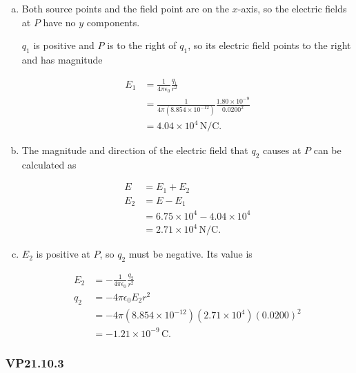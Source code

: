 \documentclass{article}
\begin{document}
\begin{enumerate}[a)]
  \item Both source points and the field point are on the $x$-axis, so the electric fields at $P$ have no $y$ components.

        $q_1$ is positive and $P$ is to the right of $q_1$, so its electric field points to the right and has magnitude

        \begin{align*}
          E_1 & = \frac{1}{4 \pi \epsilon_0} \frac{q_1}{r^2}                                   \\
              & = \frac{1}{4 \pi (8.854 \times 10^{-12})} \frac{1.80 \times 10^{-9}}{0.0200^2} \\
              & = 4.04 \times 10^4 \,\textrm{N}/\textrm{C}.
        \end{align*}

  \item The magnitude and direction of the electric field that $q_2$ causes at $P$ can be calculated as

        \begin{align*}
          E   & = E_1 + E_2                                 \\
          E_2 & = E - E_1                                   \\
              & = 6.75 \times 10^4 - 4.04 \times 10^4       \\
              & = 2.71 \times 10^4 \,\textrm{N}/\textrm{C}.
        \end{align*}

  \item $E_2$ is positive at $P$, so $q_2$ must be negative. Its value is

        \begin{align*}
          E_2 & = -\frac{1}{4 \pi \epsilon_0} \frac{q_2}{r^2}                  \\
          q_2 & = -4 \pi \epsilon_0 E_2 r^2                                    \\
              & = -4 \pi (8.854 \times 10^{-12}) (2.71 \times 10^4) (0.0200)^2 \\
              & = -1.21 \times 10^{-9} \,\textrm{C}.
        \end{align*}
\end{enumerate}

\subsubsection{VP21.10.3}
\end{document}

